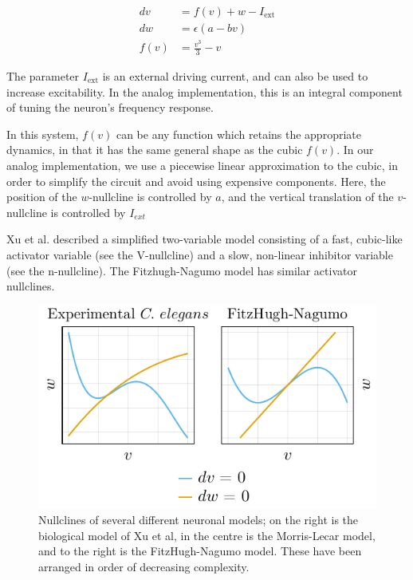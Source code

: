 \documentclass[
    11pt,
]{article}
\begin{document}
\begin{equation}
    \label{eq: fhn}
    \begin{aligned}
        dv &= f(v) + w - I_\mathrm{ext}\\
        dw &= \epsilon (a - bv)\\
        f(v) &= \frac{v^3}{3} - v
    \end{aligned}
\end{equation}

The parameter $I_\mathrm{ext}$ is an external driving current, and can also be used to increase excitability.  In the analog implementation, this is an integral component of tuning the neuron's frequency response.

In this system, $f(v)$ can be any function which retains the appropriate dynamics, in that it has the same general shape as the cubic $f(v)$.  In our analog implementation, we use a piecewise linear approximation to the cubic, in order to simplify the circuit and avoid using expensive components.  Here, the position of the $w$-nullcline is controlled by $a$, and the vertical translation of the $v$-nullcline is controlled by $I_{ext}$

Xu et al. described a simplified two-variable model consisting of a fast, cubic-like activator variable (see the V-nullcline) and a slow, non-linear inhibitor variable (see the n-nullcline). The Fitzhugh-Nagumo model has similar activator nullclines.

\begin{figure}[h!]
    \label{fig: nm nullclines}
    \centering
    \includegraphics{figures/neuron_dynamics/neuron_dynamics.pdf}
    \caption{Nullclines of several different neuronal models; on the right is the biological model of Xu et al, in the centre is the Morris-Lecar model, and to the right is the FitzHugh-Nagumo model.  These have been arranged in order of decreasing complexity.}
\end{figure}
\end{document}
